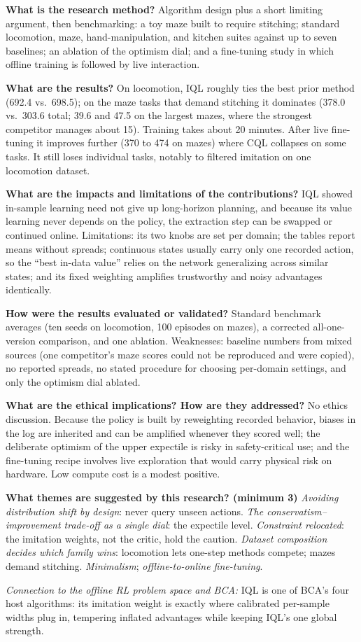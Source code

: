 \documentclass[11pt]{article}
\newcommand{\q}[2]{\item \textbf{#1} #2}
\newcommand{\tiein}[1]{\par\smallskip\noindent\emph{Connection to the offline RL problem space and BCA:} #1\par\medskip}
\begin{document}
\begin{qna}
\q{What is the research method?}
Algorithm design plus a short limiting argument, then benchmarking: a toy maze built to require stitching; standard locomotion, maze, hand-manipulation, and kitchen suites against up to seven baselines; an ablation of the optimism dial; and a fine-tuning study in which offline training is followed by live interaction.

\q{What are the results?}
On locomotion, IQL roughly ties the best prior method (692.4 vs.\ 698.5); on the maze tasks that demand stitching it dominates (378.0 vs.\ 303.6 total; 39.6 and 47.5 on the largest mazes, where the strongest competitor manages about 15). Training takes about 20 minutes. After live fine-tuning it improves further (370 to 474 on mazes) where CQL collapses on some tasks. It still loses individual tasks, notably to filtered imitation on one locomotion dataset.

\q{What are the impacts and limitations of the contributions?}
IQL showed in-sample learning need not give up long-horizon planning, and because its value learning never depends on the policy, the extraction step can be swapped or continued online. Limitations: its two knobs are set per domain; the tables report means without spreads; continuous states usually carry only one recorded action, so the ``best in-data value'' relies on the network generalizing across similar states; and its fixed weighting amplifies trustworthy and noisy advantages identically.

\q{How were the results evaluated or validated?}
Standard benchmark averages (ten seeds on locomotion, 100 episodes on mazes), a corrected all-one-version comparison, and one ablation. Weaknesses: baseline numbers from mixed sources (one competitor's maze scores could not be reproduced and were copied), no reported spreads, no stated procedure for choosing per-domain settings, and only the optimism dial ablated.

\q{What are the ethical implications? How are they addressed?}
No ethics discussion. Because the policy is built by reweighting recorded behavior, biases in the log are inherited and can be amplified whenever they scored well; the deliberate optimism of the upper expectile is risky in safety-critical use; and the fine-tuning recipe involves live exploration that would carry physical risk on hardware. Low compute cost is a modest positive.

\q{What themes are suggested by this research? (minimum 3)}
\emph{Avoiding distribution shift by design}: never query unseen actions. \emph{The conservatism--improvement trade-off as a single dial}: the expectile level. \emph{Constraint relocated}: the imitation weights, not the critic, hold the caution. \emph{Dataset composition decides which family wins}: locomotion lets one-step methods compete; mazes demand stitching. \emph{Minimalism}; \emph{offline-to-online fine-tuning}.

\end{qna}
\tiein{IQL is one of BCA's four host algorithms: its imitation weight is exactly where calibrated per-sample widths plug in, tempering inflated advantages while keeping IQL's one global strength.}
\end{document}
